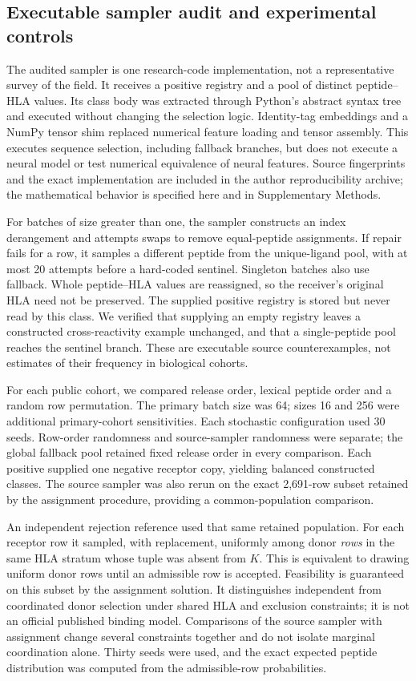 \documentclass[pdflatex,sn-basic,Numbered]{sn-jnl}
\begin{document}
\subsection{Executable sampler audit and experimental controls}
The audited sampler is one research-code implementation, not a representative survey of the field. It receives a positive registry and a pool of distinct peptide--HLA values. Its class body was extracted through Python's abstract syntax tree and executed without changing the selection logic. Identity-tag embeddings and a NumPy tensor shim replaced numerical feature loading and tensor assembly. This executes sequence selection, including fallback branches, but does not execute a neural model or test numerical equivalence of neural features. Source fingerprints and the exact implementation are included in the author reproducibility archive; the mathematical behavior is specified here and in Supplementary Methods.

For batches of size greater than one, the sampler constructs an index derangement and attempts swaps to remove equal-peptide assignments. If repair fails for a row, it samples a different peptide from the unique-ligand pool, with at most 20 attempts before a hard-coded sentinel. Singleton batches also use fallback. Whole peptide--HLA values are reassigned, so the receiver's original HLA need not be preserved. The supplied positive registry is stored but never read by this class. We verified that supplying an empty registry leaves a constructed cross-reactivity example unchanged, and that a single-peptide pool reaches the sentinel branch. These are executable source counterexamples, not estimates of their frequency in biological cohorts.

For each public cohort, we compared release order, lexical peptide order and a random row permutation. The primary batch size was 64; sizes 16 and 256 were additional primary-cohort sensitivities. Each stochastic configuration used 30 seeds. Row-order randomness and source-sampler randomness were separate; the global fallback pool retained fixed release order in every comparison. Each positive supplied one negative receptor copy, yielding balanced constructed classes. The source sampler was also rerun on the exact 2,691-row subset retained by the assignment procedure, providing a common-population comparison.

An independent rejection reference used that same retained population. For each receptor row it sampled, with replacement, uniformly among donor \emph{rows} in the same HLA stratum whose tuple was absent from $K$. This is equivalent to drawing uniform donor rows until an admissible row is accepted. Feasibility is guaranteed on this subset by the assignment solution. It distinguishes independent from coordinated donor selection under shared HLA and exclusion constraints; it is not an official published binding model. Comparisons of the source sampler with assignment change several constraints together and do not isolate marginal coordination alone. Thirty seeds were used, and the exact expected peptide distribution was computed from the admissible-row probabilities.
\end{document}
